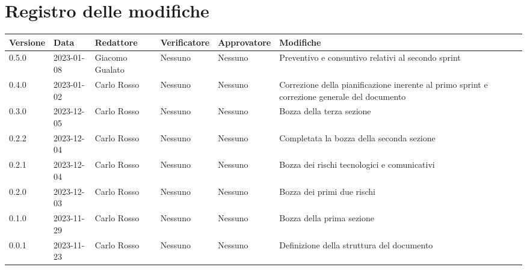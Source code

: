 \section*{Registro delle modifiche}

\begin{table}[H]
	\centering
	\fontsize{10}{12}\selectfont
	\begin{tabularx}{\textwidth}{l|l|l|l|l|X}
		\textbf{Versione} & \textbf{Data} & \textbf{Redattore} & \textbf{Verificatore} & \textbf{Approvatore} & \textbf{Modifiche}                                 \\
		\toprule
		0.5.0             & 2023-01-08    & Giacomo Gualato    & Nessuno               & Nessuno              & Preventivo e consuntivo relativi al secondo sprint \\
		0.4.0             & 2023-01-02    & Carlo Rosso        & Nessuno               & Nessuno              & Correzione della pianificazione inerente al
		primo sprint e correzione generale del documento                                                                                                           \\
		0.3.0             & 2023-12-05    & Carlo Rosso        & Nessuno               & Nessuno              & Bozza della terza sezione                          \\
		0.2.2             & 2023-12-04    & Carlo Rosso        & Nessuno               & Nessuno              & Completata la bozza della seconda sezione          \\
		0.2.1             & 2023-12-04    & Carlo Rosso        & Nessuno               & Nessuno              & Bozza dei rischi tecnologici e comunicativi        \\
		0.2.0             & 2023-12-03    & Carlo Rosso        & Nessuno               & Nessuno              & Bozza dei primi due rischi                         \\
		0.1.0             & 2023-11-29    & Carlo Rosso        & Nessuno               & Nessuno              & Bozza della prima sezione                          \\
		0.0.1             & 2023-11-23    & Carlo Rosso        & Nessuno               & Nessuno              & Definizione della struttura del documento          \\
		\bottomrule
	\end{tabularx}
\end{table}
